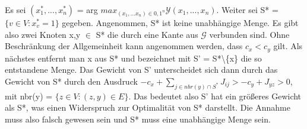 \documentclass[runningheads]{llncs}
\begin{document}
Es sei  $(x^*_{1},...,x^*_{n})$ = arg $max_{(x_{1},...x_{n})\in{0,1}^n} \mathcal{Y}(x_{1},...,x_{n})$. Weiter sei S* = $\{v \in V: x^*_{v}=1\}$ gegeben. Angenommen, S* ist keine unabhängige Menge. Es gibt also zwei Knoten x,y $\in$ S* die durch eine Kante aus $\mathcal{G}$ verbunden sind. Ohne Beschränkung der Allgemeinheit kann angenommen werden, dass $c_{x} < c_{y}$ gilt. Als nächstes entfernt man x aus S* und bezeichnet mit S' = S*\textbackslash\{x\} die so entstandene Menge. Das Gewicht von S' unterscheidet sich dann durch das Gewicht von S* durch den Ausdruck $-c_{x} + \sum_{j \in nbr(y) \cap S^*}J_{ij} > -c_{y} + J_{yz} > 0$, mit nbr(y) = $\{ z \in V: (z,y) \in E\}$. Das bedeutet also S' hat ein größeres Gewicht als S*, was einen Widerspruch zur Optimalität von S* darstellt. Die Annahme muss also falsch gewesen sein und S* muss eine unabhängige Menge sein. 
\end{document}
